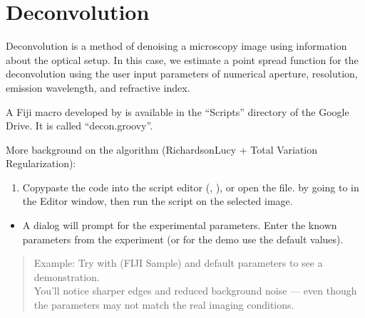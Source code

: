 \documentclass[letterpaper,10pt,english]{jupyterBook}
\begin{document}
\sphinxstepscope


\chapter{Deconvolution}
\label{\detokenize{deconvolution:deconvolution}}\label{\detokenize{deconvolution::doc}}
\sphinxAtStartPar
Deconvolution is a method of denoising a microscopy image using information about the optical
setup. In this case, we estimate a point spread function for the deconvolution using the user
input parameters of numerical aperture, resolution, emission wavelength, and refractive index.

\sphinxAtStartPar
A Fiji macro developed by  is available in the “Scripts” directory of the Google Drive. It is called “decon.groovy”.

\sphinxAtStartPar
More background on the algorithm (Richardson\sphinxhyphen{}Lucy + Total Variation Regularization):\\
\begin{enumerate}
%
\item {} 
\sphinxAtStartPar
Copy\sphinxhyphen{}paste the code into the script editor (, ), or open the  file.  by going to  in the Editor window, then run the script on the selected image.

\end{enumerate}

\sphinxAtStartPar
{}
\begin{itemize}
\item {} 
\sphinxAtStartPar
A dialog will prompt for the experimental parameters. Enter the known parameters from the experiment
(or for the demo use the default values).

\end{itemize}

\sphinxAtStartPar
{}
\begin{quote}

\sphinxAtStartPar
Example: Try with  (FIJI Sample) and default parameters to see a demonstration.\\
You’ll notice sharper edges and reduced background noise — even though the parameters may not match the real imaging conditions.
\end{quote}
\end{document}
